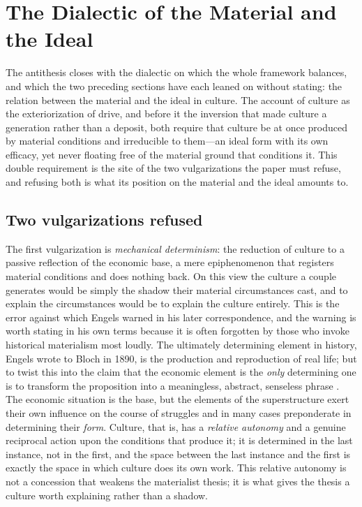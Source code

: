 \section{The Dialectic of the Material and the Ideal}
\label{p24:sec:material}

\noindent
The antithesis closes with the dialectic on which the whole framework balances, and which the two preceding sections have each leaned on without stating: the relation between the material and the ideal in culture. The account of culture as the exteriorization of drive, and before it the inversion that made culture a generation rather than a deposit, both require that culture be at once produced by material conditions and irreducible to them---an ideal form with its own efficacy, yet never floating free of the material ground that conditions it. This double requirement is the site of the two vulgarizations the paper must refuse, and refusing both is what its position on the material and the ideal amounts to.

\subsection*{Two vulgarizations refused}

The first vulgarization is \emph{mechanical determinism}: the reduction of culture to a passive reflection of the economic base, a mere epiphenomenon that registers material conditions and does nothing back. On this view the culture a couple generates would be simply the shadow their material circumstances cast, and to explain the circumstances would be to explain the culture entirely. This is the error against which Engels warned in his later correspondence, and the warning is worth stating in his own terms because it is often forgotten by those who invoke historical materialism most loudly. The ultimately determining element in history, Engels wrote to Bloch in 1890, is the production and reproduction of real life; but to twist this into the claim that the economic element is the \emph{only} determining one is to transform the proposition into a meaningless, abstract, senseless phrase \parencite{engels1890bloch}. The economic situation is the base, but the elements of the superstructure exert their own influence on the course of struggles and in many cases preponderate in determining their \emph{form}. Culture, that is, has a \emph{relative autonomy} and a genuine reciprocal action upon the conditions that produce it; it is determined in the last instance, not in the first, and the space between the last instance and the first is exactly the space in which culture does its own work. This relative autonomy is not a concession that weakens the materialist thesis; it is what gives the thesis a culture worth explaining rather than a shadow.

